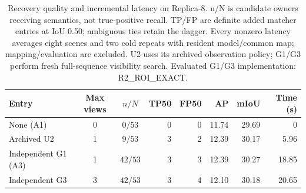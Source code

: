 \begin{table}[!ht]
\centering
\caption{Recovery quality and incremental latency on Replica-8. n/N is candidate owners receiving semantics, not true-positive recall. TP/FP are definite added matcher entries at IoU 0.50; ambiguous ties retain the dagger. Every nonzero latency averages eight scenes and two cold repeats with resident model/common map; mapping/evaluation are excluded. U2 uses its archived observation policy; G1/G3 perform fresh full-sequence visibility search. Evaluated G1/G3 implementation: R2\_ROI\_EXACT.}
\label{tab:recovery}
\fontsize{9}{10.5}\selectfont
\setlength{\tabcolsep}{4pt}
\begin{tabular*}{\textwidth}{@{\extracolsep{\fill}}lccrrrrr@{}}
\toprule
Entry & Max views & $n/N$ & TP50 & FP50 & AP & mIoU & Time (s) \\
\midrule
None (A1) & 0 & $0/53$ & 0 & 0 & 11.74 & 29.69 & 0 \\
Archived U2 & 1 & $9/53$ & 3 & 2 & 12.39 & 30.17 & 5.96 \\
Independent G1 (A3) & 1 & $42/53$ & 3 & 3 & 12.39 & 30.27 & 18.85 \\
Independent G3 & 3 & $42/53$ & 3 & 4 & 12.10 & 30.18 & 20.65 \\
\bottomrule
\end{tabular*}
\end{table}
